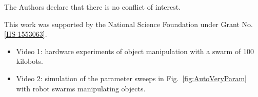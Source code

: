 \documentclass[Afour,sageh,times]{sagej} %
\begin{document}

\maketitle


%











\begin{dci}
The Authors declare that there is no conflict of interest.
\end{dci}
\begin{funding}
This work was supported by the National Science Foundation under Grant No.\ 
\href{http://nsf.gov/awardsearch/showAward?AWD_ID=1553063}{ [IIS-1553063]}.
\end{funding}
\begin{sm}
\begin{itemize}
\item Video 1: hardware experiments of object manipulation with a swarm of 100 kilobots.
\item Video 2:  simulation of the parameter sweeps in Fig.~\ref{fig:AutoVeryParam} with robot swarms manipulating objects.
\end{itemize}
\end{sm}

   
%
   
%


\end{document}
